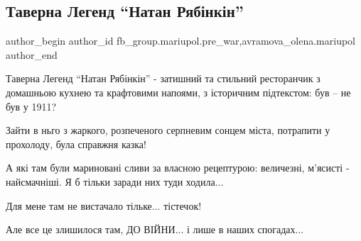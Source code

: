  
 
 
 
 

\subsection{Таверна Легенд \enquote{Натан Рябінкін}}
\label{sec:04_02_2023.fb.fb_group.mariupol.pre_war.5.taverna_legend__nata}
 
\ifcmt
 author_begin
   author_id fb_group.mariupol.pre_war,avramova_olena.mariupol
 author_end
\fi

Таверна Легенд \enquote{Натан Рябінкін} - затишний та стильний ресторанчик з домашньою
кухнею та крафтовими напоями, з історичним підтекстом: був – не був у 1911?

Зайти в ньго з жаркого, розпеченого серпневим сонцем міста, потрапити у
прохолоду, була  справжня казка!

А які там були мариновані сливи за власною рецептурою: величезні, м'ясисті -
найсмачніші. Я б тільки заради них туди  ходила...

Для мене там не вистачало тільке... тістечок!

Але все це  злишилося там, ДО ВІЙНИ...  і лише в наших спогадах...

